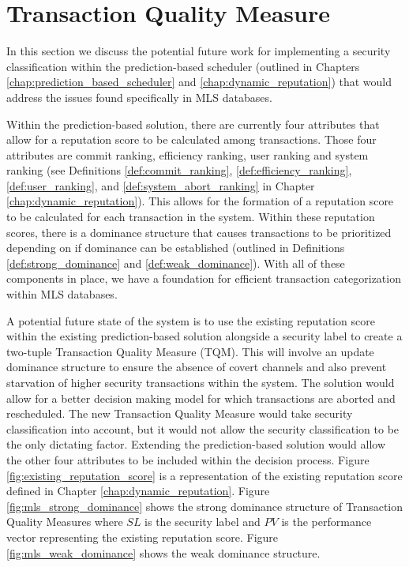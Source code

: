 \section{Transaction Quality Measure}
\label{mls:tqm}

In this section we discuss the potential future work for implementing a security classification within the prediction-based scheduler (outlined in Chapters \ref{chap:prediction_based_scheduler} and \ref{chap:dynamic_reputation}) that would address the issues found specifically in \ac{MLS} databases. 

Within the prediction-based solution, there are currently four attributes that allow for a reputation score to be calculated among transactions. Those four attributes are commit ranking, efficiency ranking, user ranking and system ranking (see Definitions \ref{def:commit_ranking}, \ref{def:efficiency_ranking}, \ref{def:user_ranking}, and \ref{def:system_abort_ranking} in Chapter \ref{chap:dynamic_reputation}). This allows for the formation of a reputation score to be calculated for each transaction in the system. Within these reputation scores, there is a dominance structure that causes transactions to be prioritized depending on if dominance can be established (outlined in Definitions \ref{def:strong_dominance} and \ref{def:weak_dominance}). With all of these components in place, we have a foundation for efficient transaction categorization within \ac{MLS} databases.

A potential future state of the system is to use the existing reputation score within the existing prediction-based solution alongside a security label to create a two-tuple Transaction Quality Measure (TQM). This will involve an update dominance structure to ensure the absence of covert channels and also prevent starvation of higher security transactions within the system. The solution would allow for a better decision making model for which transactions are aborted and rescheduled. The new Transaction Quality Measure would take security classification into account, but it would not allow the security classification to be the only dictating factor. Extending the prediction-based solution would allow the other four attributes to be included within the decision process. Figure \ref{fig:existing_reputation_score} is a representation of the existing reputation score defined in Chapter \ref{chap:dynamic_reputation}. Figure \ref{fig:mls_strong_dominance} shows the strong dominance structure of Transaction Quality Measures where $SL$ is the security label and $PV$ is the performance vector representing the existing reputation score. Figure \ref{fig:mls_weak_dominance} shows the weak dominance structure.

